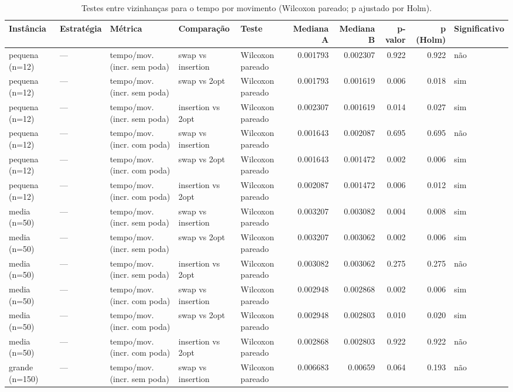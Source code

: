 \begin{table}[ht]
\centering
\small
\caption{Testes entre vizinhanças para o tempo por movimento (Wilcoxon pareado; p ajustado por Holm).}
\label{tab:testes_tempo}
\begin{tabular}{lllllrrrrl}
\hline
Instância & Estratégia & Métrica & Comparação & Teste & Mediana A & Mediana B & p-valor & p (Holm) & Significativo \\
\hline
pequena (n=12) & — & tempo/mov. (incr. sem poda) & swap vs insertion & Wilcoxon pareado & 0.001793 & 0.002307 & 0.922 & 0.922 & não \\
pequena (n=12) & — & tempo/mov. (incr. sem poda) & swap vs 2opt & Wilcoxon pareado & 0.001793 & 0.001619 & 0.006 & 0.018 & sim \\
pequena (n=12) & — & tempo/mov. (incr. sem poda) & insertion vs 2opt & Wilcoxon pareado & 0.002307 & 0.001619 & 0.014 & 0.027 & sim \\
pequena (n=12) & — & tempo/mov. (incr. com poda) & swap vs insertion & Wilcoxon pareado & 0.001643 & 0.002087 & 0.695 & 0.695 & não \\
pequena (n=12) & — & tempo/mov. (incr. com poda) & swap vs 2opt & Wilcoxon pareado & 0.001643 & 0.001472 & 0.002 & 0.006 & sim \\
pequena (n=12) & — & tempo/mov. (incr. com poda) & insertion vs 2opt & Wilcoxon pareado & 0.002087 & 0.001472 & 0.006 & 0.012 & sim \\
\hline
media (n=50) & — & tempo/mov. (incr. sem poda) & swap vs insertion & Wilcoxon pareado & 0.003207 & 0.003082 & 0.004 & 0.008 & sim \\
media (n=50) & — & tempo/mov. (incr. sem poda) & swap vs 2opt & Wilcoxon pareado & 0.003207 & 0.003062 & 0.002 & 0.006 & sim \\
media (n=50) & — & tempo/mov. (incr. sem poda) & insertion vs 2opt & Wilcoxon pareado & 0.003082 & 0.003062 & 0.275 & 0.275 & não \\
media (n=50) & — & tempo/mov. (incr. com poda) & swap vs insertion & Wilcoxon pareado & 0.002948 & 0.002868 & 0.002 & 0.006 & sim \\
media (n=50) & — & tempo/mov. (incr. com poda) & swap vs 2opt & Wilcoxon pareado & 0.002948 & 0.002803 & 0.010 & 0.020 & sim \\
media (n=50) & — & tempo/mov. (incr. com poda) & insertion vs 2opt & Wilcoxon pareado & 0.002868 & 0.002803 & 0.922 & 0.922 & não \\
\hline
grande (n=150) & — & tempo/mov. (incr. sem poda) & swap vs insertion & Wilcoxon pareado & 0.006683 & 0.00659 & 0.064 & 0.193 & não \\

\end{tabular}
\end{table}

